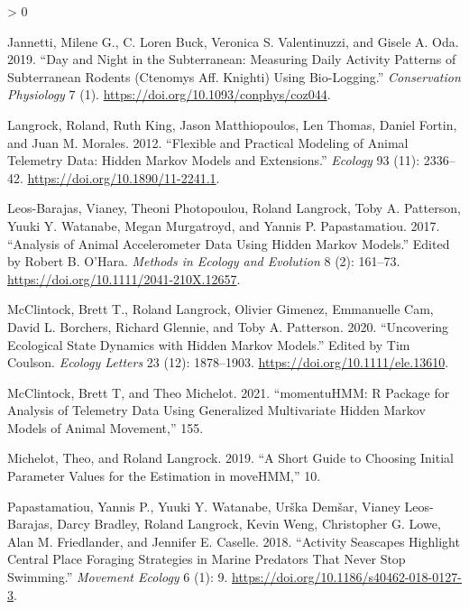 \documentclass[english,msc,numbers,hidelinks]{coppe}
\newlength{\cslhangindent}
\newenvironment{CSLReferences}[2] %
 {%
  \setlength{\parindent}{0pt}
  \ifodd #1 \everypar{\setlength{\hangindent}{\cslhangindent}}\ignorespaces\fi
  \ifnum #2 > 0
  \setlength{\parskip}{#2\baselineskip}
  \fi
 }%
 {}
\begin{document}
\begin{CSLReferences}{1}{0}
  \leavevmode\hypertarget{ref-jannetti2019}{}%
  Jannetti, Milene G., C. Loren Buck, Veronica S. Valentinuzzi, and Gisele A. Oda. 2019. {``Day and Night in the Subterranean: Measuring Daily Activity Patterns of Subterranean Rodents (Ctenomys Aff. Knighti) Using Bio-Logging.''} \emph{Conservation Physiology} 7 (1). \url{https://doi.org/10.1093/conphys/coz044}.

  \leavevmode\hypertarget{ref-langrock2012}{}%
  Langrock, Roland, Ruth King, Jason Matthiopoulos, Len Thomas, Daniel Fortin, and Juan M. Morales. 2012. {``Flexible and Practical Modeling of Animal Telemetry Data: Hidden Markov Models and Extensions.''} \emph{Ecology} 93 (11): 2336--42. \url{https://doi.org/10.1890/11-2241.1}.

  \leavevmode\hypertarget{ref-leosbarajas2017}{}%
  Leos-Barajas, Vianey, Theoni Photopoulou, Roland Langrock, Toby A. Patterson, Yuuki Y. Watanabe, Megan Murgatroyd, and Yannis P. Papastamatiou. 2017. {``Analysis of Animal Accelerometer Data Using Hidden Markov Models.''} Edited by Robert B. O'Hara. \emph{Methods in Ecology and Evolution} 8 (2): 161--73. \url{https://doi.org/10.1111/2041-210X.12657}.

  \leavevmode\hypertarget{ref-mcclintock2020}{}%
  McClintock, Brett T., Roland Langrock, Olivier Gimenez, Emmanuelle Cam, David L. Borchers, Richard Glennie, and Toby A. Patterson. 2020. {``Uncovering Ecological State Dynamics with Hidden Markov Models.''} Edited by Tim Coulson. \emph{Ecology Letters} 23 (12): 1878--1903. \url{https://doi.org/10.1111/ele.13610}.

  \leavevmode\hypertarget{ref-mcclintock2021}{}%
  McClintock, Brett T, and Theo Michelot. 2021. {``momentuHMM: R Package for Analysis of Telemetry Data Using Generalized Multivariate Hidden Markov Models of Animal Movement,''} 155.

  \leavevmode\hypertarget{ref-michelot2019}{}%
  Michelot, Theo, and Roland Langrock. 2019. {``A Short Guide to Choosing Initial Parameter Values for the Estimation in moveHMM,''} 10.

  \leavevmode\hypertarget{ref-papastamatiou2018}{}%
  Papastamatiou, Yannis P., Yuuki Y. Watanabe, Urška Demšar, Vianey Leos-Barajas, Darcy Bradley, Roland Langrock, Kevin Weng, Christopher G. Lowe, Alan M. Friedlander, and Jennifer E. Caselle. 2018. {``Activity Seascapes Highlight Central Place Foraging Strategies in Marine Predators That Never Stop Swimming.''} \emph{Movement Ecology} 6 (1): 9. \url{https://doi.org/10.1186/s40462-018-0127-3}.


\end{CSLReferences}
\end{document}
